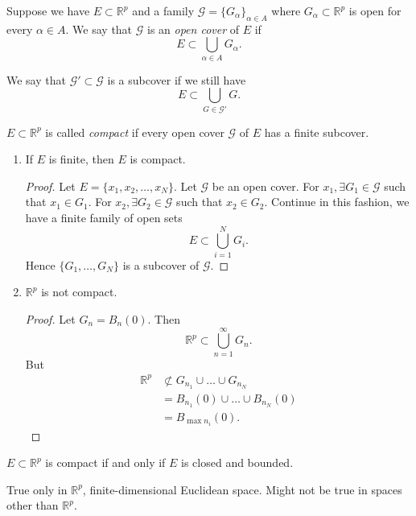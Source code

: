 
Suppose we have $E \subset \mathbb{R}^p$ and a family $\mathscr{G} = \{G_\alpha\} _{\alpha\in A}$ where $G_\alpha \subset \mathbb{R}^p$ is open for every $\alpha \in A$.
We say that $\mathcal{G}$ is an \textit{open cover} of $E$ if \[
	E \subset \bigcup_{\alpha \in A} G_\alpha
.\] 

We say that $\mathcal{G}' \subset \mathcal{G}$ is a subcover if we still have \[
	E \subset \bigcup_{G \in \mathcal{G}'} G
.\] 

\begin{definition}[Compact]
	\label{thm:heine-borel}
	$E \subset \mathbb{R}^p $ is called \textit{compact} if every open cover $\mathcal{G}$ of $E$ has a finite subcover.
\end{definition}

\begin{example}
	\begin{enumerate}
		\item If $E$ is finite, then $E$ is compact.
			\begin{proof}
				Let $E = \{x_1,x_2,\ldots,x_N\} $. Let $\mathcal{G}$ be an open cover. 
				For $x_1, \exists G_1 \in \mathcal{G}$ such that $x_1 \in G_1$.
				For $x_2, \exists G_2 \in \mathcal{G}$ such that $x_2 \in G_2$. Continue in this fashion, we have a finite family of open sets \[
				E \subset \bigcup_{i = 1} ^N G_i
				.\] 
				Hence $\{G_1, \ldots, G_N\} $ is a subcover of $\mathcal{G}$.
			\end{proof}
		\item $\mathbb{R}^p$ is not compact. 
		\begin{proof}
		Let $G_n = B_n(0)$. Then 
		\[
			\mathbb{R}^p \subset \bigcup_{n= 1} ^\infty G_n
		.\] 
		But \begin{align*}
			\mathbb{R}^p &\not \subset G_{n_1} \cup \ldots \cup G_{n_N}\\
			&= B_{n_1}(0) \cup  \ldots \cup B_{n_N}(0)\\
			&= B_{\max n_i}(0)
		.\end{align*} 
			
		\end{proof}
		
	\end{enumerate}
\end{example}

\begin{theorem}
	$E\subset \mathbb{R}^p$ is compact if and only if $E$ is closed and bounded.
\end{theorem}
\begin{remark}
	True only in $\mathbb{R}^p$, finite-dimensional Euclidean space. Might not be true in spaces other than $\mathbb{R}^p$.
\end{remark}

